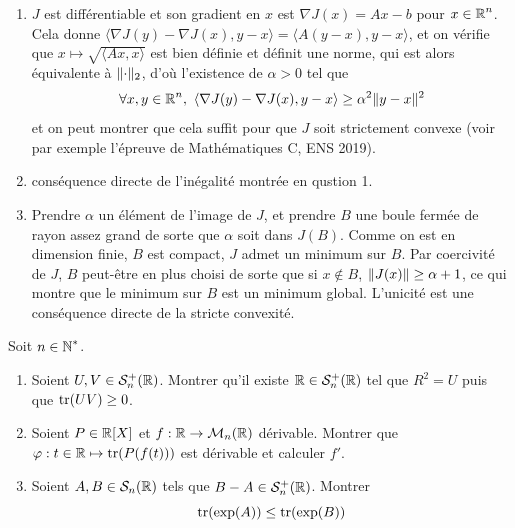 \begin{solution}
	\begin{enumerate}
		\item $J$ est différentiable et son gradient en $x$ est $\nabla J(x)=Ax-b$ pour $x\in \operatorname{\mathbb R}^n$.
		Cela donne $\langle \nabla J(y)-\nabla J(x),y-x\rangle=\langle A(y-x),y-x\rangle$, 
		et on vérifie que $x\mapsto\sqrt{\langle Ax,x\rangle}$ est bien définie et définit une norme,
		qui est alors équivalente à $\lVert\cdot\rVert_2$, d'où l'existence de $\alpha >0$ tel que 
		\[
			\forall x,y\in\operatorname{\mathbb R}^n,\ \langle \nabla J(y)-\nabla J(x),y-x\rangle\geq\alpha^2\lVert y-x\rVert^2
		\]
		et on peut montrer que cela suffit pour que $J$ soit strictement convexe (voir par exemple l'épreuve de Mathématiques C, ENS 2019).
		\item conséquence directe de l'inégalité montrée en qustion 1.
		\item Prendre $\alpha$ un élément de l'image de $J$, et prendre $B$ une boule fermée de rayon assez grand de sorte que $\alpha$ soit dans $J(B)$.
		Comme on est en dimension finie, $B$ est compact, $J$ admet un minimum sur $B$.
		Par coercivité de $J$, $B$ peut-être en plus choisi de sorte que si $x\notin B$, $\lVert J(x)\rVert\geq\alpha+1$, ce qui montre que le minimum sur $B$ est un minimum global.
		L'unicité est une conséquence directe de la stricte convexité.
	\end{enumerate}
\end{solution}

\begin{exo}
	\label{euclidiens6}
	Soit $n\in\operatorname{\mathbb N}^*$.
	\begin{enumerate}
		\item Soient $U,V\in\mathcal S_n^+(\operatorname{\mathbb R})$. Montrer qu'il existe $\operatorname{\mathbb R}\in\mathcal S_n^+(\operatorname{\mathbb R})$ tel que $R^2 = U$ puis que $\operatorname{tr}(UV)\geq 0$.
		\item Soient $P\in\operatorname{\mathbb R}[X]$ et $f:\operatorname{\mathbb R}\to\mathcal M_n(\operatorname{\mathbb R})$ dérivable. Montrer que $\varphi:t\in\operatorname{\mathbb R}\mapsto\operatorname{tr}(P(f(t)))$ est dérivable et calculer $f'$.
		\item Soient $A,B\in\mathcal S_n(\operatorname{\mathbb R})$ tels que $B-A\in\mathcal S_n^+(\operatorname{\mathbb R})$. Montrer 
		\[
			\operatorname{tr}(\exp(A))\leq\operatorname{tr}(\exp(B))
		\]
	\end{enumerate}
\end{exo}

